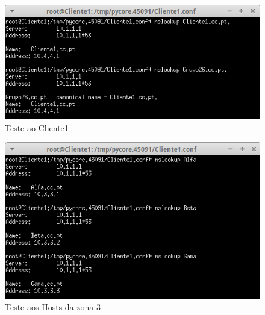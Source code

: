 \documentclass{llncs}
\begin{document}
\begin{figure}[H]
\begin{center}
\includegraphics[scale=0.75]{teste10.png}
\end{center}
\caption{\label{fig:t10}Teste ao Cliente1}
\end{figure}

\begin{figure}[H]
\begin{center}
\includegraphics[scale=0.75]{teste11.png}
\end{center}
\caption{\label{fig:t11}Teste aos Hosts da zona 3}
\end{figure}
\end{document}
